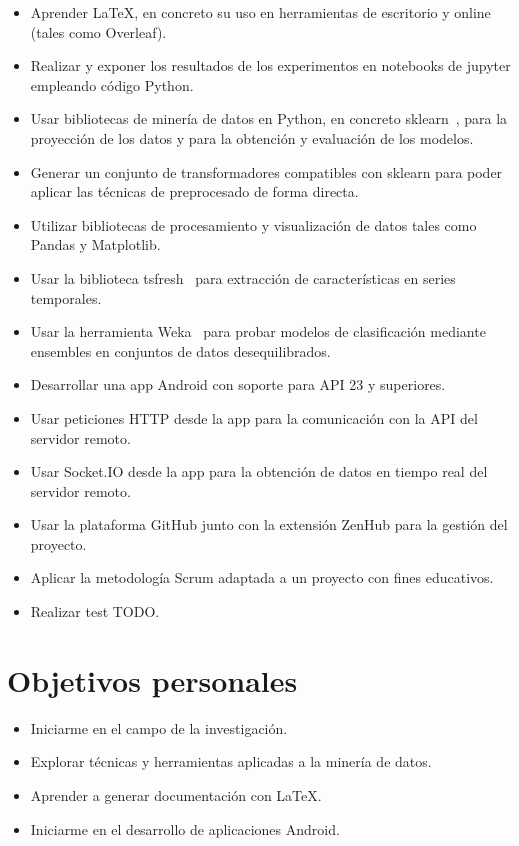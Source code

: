 \begin{itemize}
	\item Aprender \LaTeX{}, en concreto su uso en herramientas de escritorio y online (tales como Overleaf).  
	\item Realizar y exponer los resultados de los experimentos en notebooks de jupyter empleando código Python. 
	\item Usar bibliotecas de minería de datos en Python, en concreto sklearn~\cite{scikit-learn}, para la proyección de los datos y para la obtención y evaluación de los modelos.
	\item Generar un conjunto de transformadores compatibles con sklearn para poder aplicar las técnicas de preprocesado de forma directa.
	\item Utilizar bibliotecas de procesamiento y visualización de datos tales como Pandas y Matplotlib.  
	\item Usar la biblioteca tsfresh~\cite{christ2018time} para extracción de características en series temporales. 
	\item Usar la herramienta Weka~\cite{hall2009weka} para probar modelos de clasificación mediante ensembles en conjuntos de datos desequilibrados. 
	\item Desarrollar una app Android con soporte para API 23 y superiores. 
	\item Usar peticiones HTTP desde la app para la comunicación con la API del servidor remoto. 
	\item Usar Socket.IO desde la app para la obtención de datos en tiempo real del servidor remoto.
	\item Usar la plataforma GitHub junto con la extensión ZenHub para la gestión del proyecto. 
	\item Aplicar la metodología Scrum adaptada a un proyecto con fines educativos. 
	\item Realizar test TODO. 
	
	
\end{itemize}

\section{Objetivos personales}

\begin{itemize}
	\item Iniciarme en el campo de la investigación. 
	\item Explorar técnicas y herramientas aplicadas a la minería de datos. 
	\item Aprender a generar documentación con \LaTeX{}. 
	\item Iniciarme en el desarrollo de aplicaciones Android. 
\end{itemize}
